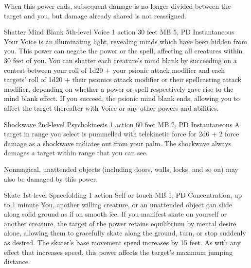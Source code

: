  When this power ends,
  subsequent damage is no longer divided between the target and you,
  but damage already shared is not reassigned.

\DndPowerHeader%
  {Shatter Mind Blank}
  {5th-level Voice}
  {1 action}
  {30 feet}
  {MB 5, PD \lvlfive}
  {Instantaneous}
  Your Voice is an illuminating light,
  revealing minds which have been hidden from you.
  This power can negate the  power
  or the  spell,
  affecting all creatures within 30 feet of you.
  You can shatter each creature's mind blank by succeeding on a
  contest between your roll of
  1d20 + your psionic attack modifier
  and each targets' roll of 
  1d20 + their psionics attack modifier or
  their spellcasting attack modifier,
  depending on whether a power or spell respectively
  gave rise to the mind blank effect.
  If you succeed,
  the psionic mind blank ends,
  allowing you to affect the target thereafter
  with Voice or any other powers and abilities.

\DndPowerHeader%
  {Shockwave}
  {2nd-level Psychokinesis}
  {1 action}
  {60 feet}
  {MB 2, PD \lvltwo}
  {Instantaneous}
A target in range you select is pummelled with telekinetic force
for 2d6 + 2 force damage as a shockwave radiates out from your palm.
The shockwave always damages a target within range that you can see.

Nonmagical, unattended objects
(including doors, walls, locks, and so on)
may also be damaged by this power.

\DndPowerHeader%
  {Skate}
  {1st-level Spacefolding}
  {1 action}
  {Self or touch}
  {MB 1, PD \lvlone}
  {Concentration, up to 1 minute}
  You, another willing creature, or an unattended object
  can slide along solid ground as if on smooth ice.
  If you manifest skate on yourself or another creature,
  the target of the power retains equilibrium by mental desire alone,
  allowing them to gracefully skate along the ground,
  turn, or stop suddenly as desired.
  The skater's base movement speed increases by 15 feet.
  As with any effect that increases speed,
  this power affects the target's maximum jumping distance.

